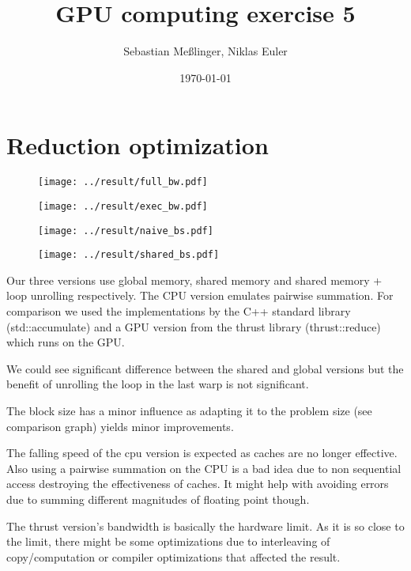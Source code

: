 \documentclass[11pt,twoside,a4paper]{scrartcl}
\title{GPU computing exercise 5}
\date{\today}
\author{Sebastian Meßlinger, Niklas Euler}
\begin{document}
\maketitle



\section{Reduction optimization}

\begin{figure}
    \texttt{[image: ../result/full\_bw.pdf]}
\end{figure}
\begin{figure}
    \texttt{[image: ../result/exec\_bw.pdf]}
\end{figure}
\begin{figure}
    \texttt{[image: ../result/naive\_bs.pdf]}
\end{figure}
\begin{figure}
    \texttt{[image: ../result/shared\_bs.pdf]}
\end{figure}
Our three versions use global memory, shared memory and shared memory + loop unrolling respectively.
The CPU version emulates pairwise summation. For comparison we used the implementations by the C++ standard library (std::accumulate) and a GPU version from the thrust library (thrust::reduce) which runs on the GPU.

We could see significant difference between the shared and global versions but the benefit of unrolling the loop in the last warp is not significant.

The block size has a minor influence as adapting it to the problem size (see comparison graph) yields minor improvements.

The falling speed of the cpu version is expected as caches are no longer effective. Also using a pairwise summation on the CPU is a bad idea due to non sequential access destroying the effectiveness of caches. It might help with avoiding errors due to summing different magnitudes of floating point though.

The thrust version's bandwidth is basically the hardware limit. As it is so close to the limit, there might be some optimizations due to interleaving of copy/computation or compiler optimizations that affected the result.
\end{document}
